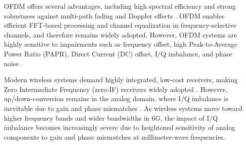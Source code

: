 \documentclass[lettersize,journal]{IEEEtran}
\begin{document}
OFDM offers several advantages, including high spectral efficiency and strong robustness against multi-path fading and Doppler effects \cite{Prasad}.
OFDM enables efficient FFT-based processing and channel equalization in frequency-selective channels, and therefore remains widely adopted.
However, OFDM systems are highly sensitive to impairments such as frequency offset, high 
Peak-to-Average Power Ratio (PAPR), Direct Current (DC) offset, I/Q imbalance, and phase noise \cite{REF4, REF5}.

Modern wireless systems demand highly integrated, low-cost receivers, making Zero Intermediate Frequency (zero-IF) receivers widely adopted \cite{REF6}.
However, up/down-conversion remains in the analog domain, where I/Q imbalance is inevitable due to gain and phase mismatches \cite{Razavi}.
As wireless systems move toward higher frequency bands and wider bandwidths in 6G, the impact of I/Q imbalance becomes increasingly severe due to heightened sensitivity of analog components to gain and phase mismatches at millimeter-wave frequencies.
\end{document}
